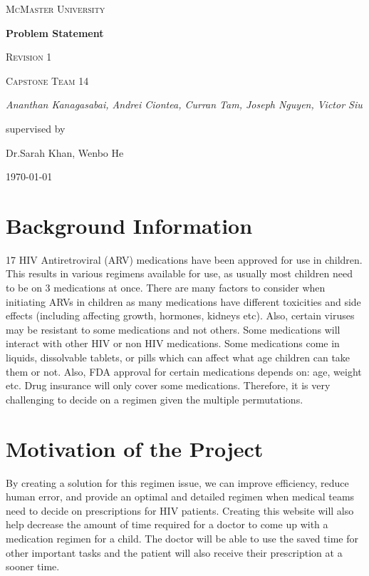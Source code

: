 \documentclass[12pt]{article}
\begin{document}
\begin{titlepage}
	\centering
	{\scshape\LARGE McMaster University \par}
	\vspace{1.5cm}
	{\huge\bfseries Problem Statement\par}
    {\scshape\Large Revision 1 \par}

	\vspace{1cm}
	{\scshape\Large Capstone Team 14\par}
	{\Large\itshape Ananthan Kanagasabai, Andrei Ciontea, Curran Tam, Joseph Nguyen, Victor Siu \par}
	\vspace{3cm}
	\vfill
	supervised by\par
	Dr.Sarah Khan, Wenbo He

	\vfill	
{\large \today\par}
\end{titlepage}

\newpage

\tableofcontents
\newpage

\section{Background Information}
17 HIV Antiretroviral (ARV) medications have been approved for use in children. This results in various regimens available for use, as usually most children need to be on 3 medications at once. There are many factors to consider when initiating ARVs in children as many medications
have different toxicities and side effects (including affecting growth, hormones, kidneys etc). Also, certain viruses may be resistant to some medications and not others. Some medications will interact with other HIV or non HIV medications. Some medications come in liquids, dissolvable tablets, or pills which can affect what age children can take them or not. Also, FDA approval for certain medications depends on: age, weight etc. Drug insurance will only cover some medications. Therefore, it is very challenging to decide on a regimen given the multiple permutations.

\section{Motivation of the Project}
By creating a solution for this regimen issue, we can improve efficiency, reduce human error, and provide an optimal and detailed regimen when medical teams need to decide on prescriptions for HIV patients. Creating this website will also help decrease the amount of time required for a doctor to come up with a medication regimen for a child. The doctor will be able to use the saved time for other important tasks and the patient will also receive their prescription at a sooner time.
\end{document}
